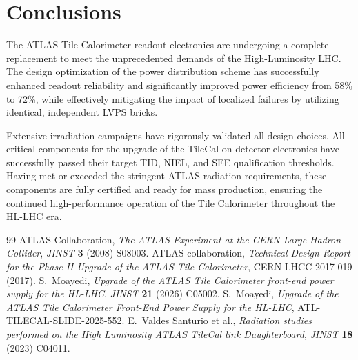 \documentclass[a4paper,11pt]{article}
\begin{document}
\section{Conclusions}
\label{sec:conclusion}

The ATLAS Tile Calorimeter readout electronics are undergoing a complete replacement to meet the unprecedented demands of the High-Luminosity LHC. The design optimization of the power distribution scheme has successfully enhanced readout reliability and significantly improved power efficiency from 58\% to 72\%, while effectively mitigating the impact of localized failures by utilizing identical, independent LVPS bricks.

Extensive irradiation campaigns have rigorously validated all design choices. All critical components for the upgrade of the TileCal on-detector electronics have successfully passed their target TID, NIEL, and SEE qualification thresholds. Having met or exceeded the stringent ATLAS radiation requirements, these components are fully certified and ready for mass production, ensuring the continued high-performance operation of the Tile Calorimeter throughout the HL-LHC era.

\begin{thebibliography}{99}
ATLAS Collaboration,
\emph{The ATLAS Experiment at the CERN Large Hadron Collider},
\emph{JINST} {\bf 3} (2008) S08003.
ATLAS collaboration,
\emph{Technical Design Report for the Phase-II Upgrade of the ATLAS Tile Calorimeter},
CERN-LHCC-2017-019 (2017).
S.\ Moayedi,
\emph{Upgrade of the ATLAS Tile Calorimeter front-end power supply for the HL-LHC},
\emph{JINST} {\bf 21} (2026) C05002.
S.\ Moayedi,
\emph{Upgrade of the ATLAS Tile Calorimeter Front-End Power Supply for the HL-LHC},
ATL-TILECAL-SLIDE-2025-552.
E.\ Valdes Santurio et al.,
\emph{Radiation studies performed on the High Luminosity ATLAS TileCal link Daughterboard},
\emph{JINST} {\bf 18} (2023) C04011.
\end{thebibliography}
\end{document}
